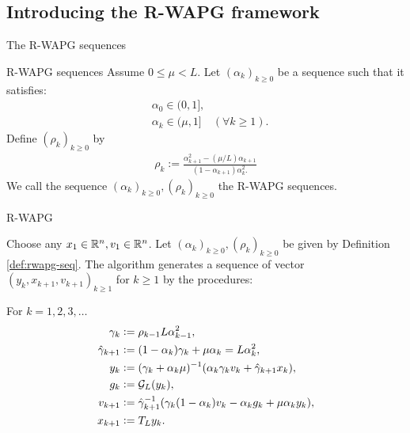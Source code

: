 \documentclass[11pt]{beamer}
\theoremstyle{definition}
\begin{document}
    \subsection{Introducing the R-WAPG framework}
        \begin{frame}{The R-WAPG sequences}
            \begin{definition}{R-WAPG sequences}\label{def:rwapg-seq}
                Assume $0 \le \mu < L$. 
                Let $(\alpha_k)_{k \ge 0}$ be a sequence such that it satisfies: 
                \begin{align*}
                    & \alpha_0 \in (0, 1], \\
                    & \alpha_k \in (\mu, 1] \quad (\forall k \ge 1). 
                \end{align*}    
                Define $(\rho_k)_{k \ge 0}$ by 
                \begin{align*}
                    \rho_k := \frac{\alpha_{k + 1}^2 - (\mu/L) \alpha_{k + 1}}{
                        (1 - \alpha_{k + 1}) \alpha_k^2.
                    }
                \end{align*}
                We call the sequence $(\alpha_k)_{k \ge 0}, (\rho_k)_{k \ge0}$ the R-WAPG sequences. 
            \end{definition}
        \end{frame}
        \begin{frame}{R-WAPG}
            \begin{definition}\label{def:wapg}
                Choose any $x_1 \in \mathbb R^n, v_1 \in \mathbb R^n$.
                Let $(\alpha_k)_{k \ge0}, (\rho_k)_{k \ge 0}$ be given by Definition \ref{def:rwapg-seq}.
                The algorithm generates a sequence of vector $(y_k, x_{k + 1}, v_{k + 1})_{k \ge 1}$ for $k\ge 1$ by the procedures:
                \begin{tcolorbox}
                    For $k=1, 2, 3, \ldots$
                    \begin{align*}
                        \gamma_k &\vcentcolon= \rho_{k -1}L\alpha_{k - 1}^2,
                        \\
                        \hat \gamma_{k + 1} & \vcentcolon= (1 - \alpha_k)\gamma_k + \mu \alpha_k = L\alpha_k^2,
                        \\
                        y_k &\vcentcolon=
                        (\gamma_k + \alpha_k \mu)^{-1}(\alpha_k \gamma_k v_k + \hat\gamma_{k + 1} x_k),
                        \\
                        g_k &\vcentcolon= \mathcal G_L (y_k),
                        \\
                        v_{k + 1} &\vcentcolon=
                        \hat\gamma^{-1}_{k + 1}
                        (\gamma_k(1 - \alpha_k) v_k - \alpha_k g_k + \mu \alpha_k y_k),
                        \\
                        x_{k + 1} &\vcentcolon= T_L y_k.
                    \end{align*}
                \end{tcolorbox}
            \end{definition}
        \end{frame}
\end{document}
